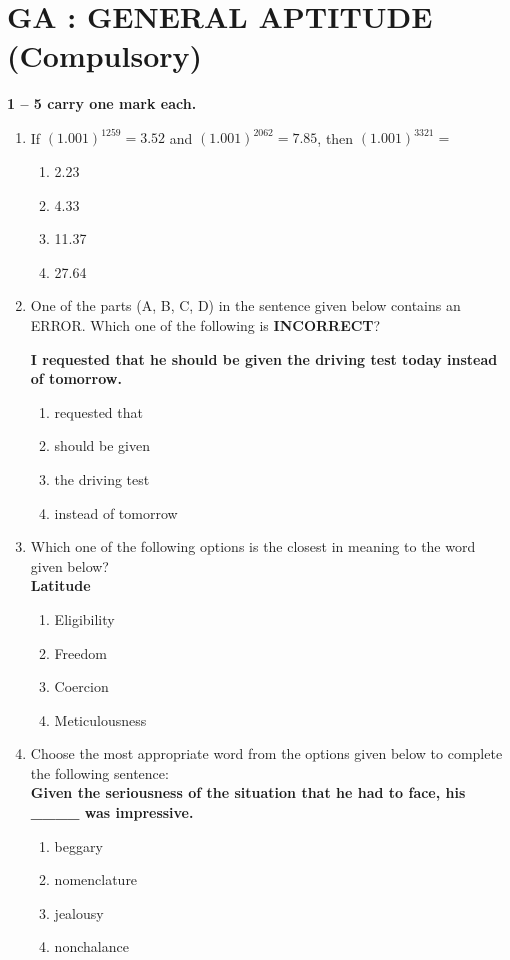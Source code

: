 \documentclass[journal,12pt,onecolumn]{IEEEtran}
\begin{document}
\section*{\centering GA : GENERAL APTITUDE (Compulsory)}

\noindent \textbf{1 -- 5 carry one mark each.}
\begin{enumerate}[label=\arabic*.]
\item If $(1.001)^{1259} = 3.52$ and $(1.001)^{2062} = 7.85$, then $(1.001)^{3321} =$ 
\begin{multicols}{4}
\begin{enumerate}[label=(\Alph*)]
\item 2.23
\item 4.33
\item 11.37
\item 27.64
\end{enumerate}
\end{multicols}

\item One of the parts (A, B, C, D) in the sentence given below contains an ERROR. Which one of the following is \textbf{INCORRECT}?

\textbf{I requested that he should be given the driving test today instead of tomorrow.}

\begin{enumerate}[label=(\Alph*)]
\item requested that
\item should be given
\item the driving test
\item instead of tomorrow
\end{enumerate}

\item Which one of the following options is the closest in meaning to the word given below?\\
\textbf{Latitude}
\begin{multicols}{4}
\begin{enumerate}[label=(\Alph*)]
\item Eligibility
\item Freedom
\item Coercion
\item Meticulousness
\end{enumerate}
\end{multicols}

\item Choose the most appropriate word from the options given below to complete the following sentence:\\
\textbf{Given the seriousness of the situation that he had to face, his \_\_\_\_ was impressive.}
\begin{multicols}{4}
\begin{enumerate}[label=(\Alph*)]
\item beggary
\item nomenclature
\item jealousy
\item nonchalance
\end{enumerate}
\end{multicols}


\end{enumerate}
\end{document}
